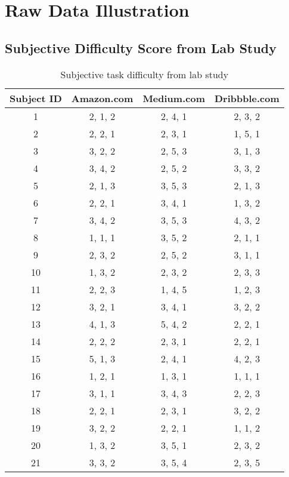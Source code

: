 \section{Raw Data Illustration}
\label{appendix:c}

\subsection{Subjective Difficulty Score from Lab Study}

\begin{table}[H]
      \small
      \centering
      \setlength{\belowcaptionskip}{10pt}
      \caption{Subjective task difficulty from lab study}

      \begin{tabular}{cccc}
            \toprule
            \textbf{Subject ID} & \textbf{Amazon.com} & \textbf{Medium.com} & \textbf{Dribbble.com} \\
            \hline
            1 & 2, 1, 2 & 2, 4, 1 & 2, 3, 2 \\
            2 & 2, 2, 1 & 2, 3, 1 & 1, 5, 1 \\
            3 & 3, 2, 2 & 2, 5, 3 & 3, 1, 3 \\
            4 & 3, 4, 2 & 2, 5, 2 & 3, 3, 2 \\
            5 & 2, 1, 3 & 3, 5, 3 & 2, 1, 3 \\
            6 & 2, 2, 1 & 3, 4, 1 & 1, 3, 2 \\
            7 & 3, 4, 2 & 3, 5, 3 & 4, 3, 2 \\
            8 & 1, 1, 1 & 3, 5, 2 & 2, 1, 1 \\
            9 & 2, 3, 2 & 2, 5, 2 & 3, 1, 1 \\
            10 & 1, 3, 2 & 2, 3, 2 & 2, 3, 3 \\
            11 & 2, 2, 3 & 1, 4, 5 & 1, 2, 3 \\
            12 & 3, 2, 1 & 3, 4, 1 & 3, 2, 2 \\
            13 & 4, 1, 3 & 5, 4, 2 & 2, 2, 1 \\
            14 & 2, 2, 2 & 2, 3, 1 & 2, 2, 1 \\
            15 & 5, 1, 3 & 2, 4, 1 & 4, 2, 3 \\
            16 & 1, 2, 1 & 1, 3, 1 & 1, 1, 1 \\
            17 & 3, 1, 1 & 3, 4, 3 & 2, 2, 3 \\
            18 & 2, 2, 1 & 2, 3, 1 & 3, 2, 2 \\
            19 & 3, 2, 2 & 2, 2, 1 & 1, 1, 2 \\
            20 & 1, 3, 2 & 3, 5, 1 & 2, 3, 2 \\
            21 & 3, 3, 2 & 3, 5, 4 & 2, 3, 5 \\
            \bottomrule
      \end{tabular}
      \label{table:diff}
\end{table}
